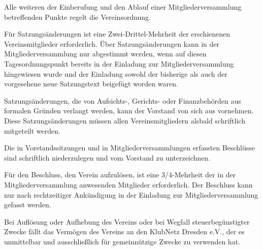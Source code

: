 \begin{contract}
    Alle weiteren der Einberufung und den Ablauf einer Mitgliederversammlung betreffenden Punkte regelt die Vereinsordnung.

    Für Satzungsänderungen ist eine Zwei-Drittel-Mehrheit der erschienenen Vereinsmitglieder erforderlich. Über Satzungsänderungen kann in der Mitgliederversammlung nur abgestimmt werden, wenn auf diesen Tagesordnungspunkt bereits in der Einladung zur Mitgliederversammlung hingewiesen wurde und der Einladung sowohl der bisherige als auch der vorgesehene neue Satzungstext beigefügt worden waren.

    Satzungsänderungen, die von Aufsichts-, Gerichts- oder Finanzbehörden aus formalen Gründen verlangt werden, kann der Vorstand von sich aus vornehmen. Diese Satzungsänderungen müssen allen Vereinsmitgliedern alsbald schriftlich mitgeteilt werden.

    Die in Vorstandssitzungen und in Mitgliederversammlungen erfassten Beschlüsse sind schriftlich niederzulegen und vom Vorstand zu unterzeichnen.

    Für den Beschluss, den Verein aufzulösen, ist eine 3/4-Mehrheit der in der Mitgliederversammlung anwesenden Mitglieder erforderlich. Der Beschluss kann nur nach rechtzeitiger Ankündigung in der Einladung zur Mitgliederversammlung gefasst werden.

    Bei Auflösung oder Aufhebung des Vereins oder bei Wegfall steuerbegünstigter Zwecke fällt das Vermögen des Vereins an den KlubNetz Dresden e.V., der es unmittelbar und ausschließlich für gemeinnützige Zwecke zu verwenden hat.

\end{contract}

